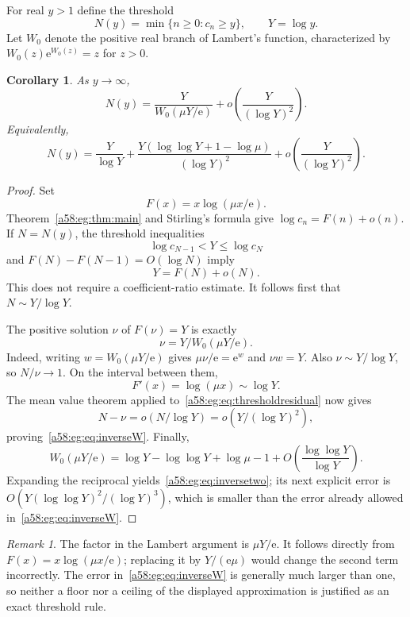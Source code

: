 \documentclass[11pt,letterpaper]{article}
\newtheorem{corollary}[theorem]{Corollary}
\theoremstyle{remark}
\newtheorem{remark}[theorem]{Remark}
\newcommand{\ee}{\mathrm e}
\newcommand{\muval}{\mu}
\begin{document}
For real $y>1$ define the threshold
\[
 N(y)=\min\{n\ge0:c_n\ge y\},\qquad Y=\log y.
\]
Let $W_0$ denote the positive real branch of Lambert's function, characterized by $W_0(z)\ee^{W_0(z)}=z$ for $z>0$.
\begin{corollary}\label{a58:eg:cor:inverse}
As $y\to\infty$,
\begin{equation}\label{a58:eg:eq:inverseW}
 N(y)=\frac{Y}{W_0(\muval Y/\ee)}
      +o\left(\frac{Y}{(\log Y)^2}\right).
\end{equation}
Equivalently,
\begin{equation}\label{a58:eg:eq:inversetwo}
 N(y)=\frac{Y}{\log Y}
 +\frac{Y(\log\log Y+1-\log\muval)}{(\log Y)^2}
 +o\left(\frac{Y}{(\log Y)^2}\right).
\end{equation}
\end{corollary}
\begin{proof}
Set
\[
 F(x)=x\log(\muval x/\ee).
\]
Theorem~\ref{a58:eg:thm:main} and Stirling's formula give $\log c_n=F(n)+o(n)$. If $N=N(y)$, the threshold inequalities
\[
 \log c_{N-1}<Y\le\log c_N
\]
and $F(N)-F(N-1)=O(\log N)$ imply
\begin{equation}\label{a58:eg:eq:thresholdresidual}
 Y=F(N)+o(N).
\end{equation}
This does not require a coefficient-ratio estimate. It follows first that $N\sim Y/\log Y$.

The positive solution $\nu$ of $F(\nu)=Y$ is exactly
\[
 \nu=Y/W_0(\muval Y/\ee).
\]
Indeed, writing $w=W_0(\muval Y/\ee)$ gives $\muval\nu/\ee=\ee^w$ and $\nu w=Y$. Also $\nu\sim Y/\log Y$, so $N/\nu\to1$. On the interval between them,
\[
 F'(x)=\log(\muval x)\sim\log Y.
\]
The mean value theorem applied to~\eqref{a58:eg:eq:thresholdresidual} now gives
\[
 N-\nu=o(N/\log Y)=o(Y/(\log Y)^2),
\]
proving~\eqref{a58:eg:eq:inverseW}. Finally,
\[
 W_0(\muval Y/\ee)
 =\log Y-\log\log Y+\log\muval-1
   +O\left(\frac{\log\log Y}{\log Y}\right).
\]
Expanding the reciprocal yields~\eqref{a58:eg:eq:inversetwo}; its next explicit error is
$O(Y(\log\log Y)^2/(\log Y)^3)$, which is smaller than the error already allowed in~\eqref{a58:eg:eq:inverseW}.
\end{proof}

\begin{remark}
The factor in the Lambert argument is $\muval Y/\ee$. It follows directly from $F(x)=x\log(\muval x/\ee)$; replacing it by $Y/(\ee\muval)$ would change the second term incorrectly. The error in~\eqref{a58:eg:eq:inverseW} is generally much larger than one, so neither a floor nor a ceiling of the displayed approximation is justified as an exact threshold rule.
\end{remark}
\end{document}
